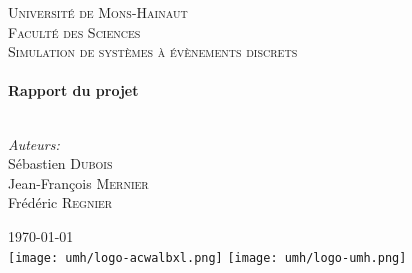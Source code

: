  \thispagestyle{empty}
\begin{center}
 
\textsc{\LARGE Université de Mons-Hainaut}\\[0.5cm]
\textsc{\Large Faculté des Sciences}\\[4.0cm]
\textsc{\Large Simulation de systèmes à évènements discrets}\\[0.5cm]
 
 
\HRule \\[0.4cm]
{ \Large \bfseries Rapport du projet}\\[0.3cm]
 
\HRule \\[1.5cm]
 
\begin{minipage}{0.4\textwidth}
\begin{flushleft} \large
\emph{Auteurs:} 
\\ Sébastien \textsc{Dubois}
\\ Jean-François \textsc{Mernier}
\\ Frédéric \textsc{Regnier}

\end{flushleft}
\end{minipage}
\begin{minipage}{0.4\textwidth}
\begin{flushright} \large
\end{flushright}
\end{minipage}


\vfill

{\Large \today}\\[1.5cm]

\texttt{[image: umh/logo-acwalbxl.png]}
\texttt{[image: umh/logo-umh.png]}

\end{center}


\newpage
\thispagestyle{empty}
\mbox{}
\newpage
